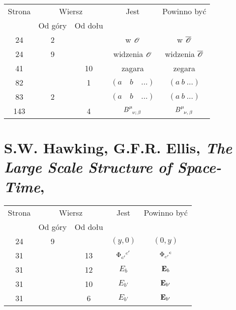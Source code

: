 \documentclass[a4paper,11pt]{article}
\numberwithin{equation}{section}
\begin{document}
\begin{center}

  \begin{tabular}{|c|c|c|c|c|}
    \hline
    Strona & \multicolumn{2}{c|}{Wiersz} & Jest
                              & Powinno być \\ \cline{2-3}
    & Od góry & Od dołu & & \\
    \hline
    24 & 2 & & w $\mathcal{O}$ & w $\overline{ \mathcal{O} }$ \\
    24 & 9 & & widzenia $\mathcal{O}$ & widzenia $\overline{ \mathcal{O} }$ \\
    41 & & 10 & zagara & zegara \\
    82 & & 1 & $( a \quad b \quad \ldots )$ & $( a \: b \: \ldots )$ \\
    83 & 2 & & $( a \quad b \quad \ldots )$ & $( a \: b \: \ldots )$ \\
    143 & & 4 & $B\indices{^\mu_{ v ; \, \beta }}$ & $B\indices{ ^\mu_{ \nu, \, \beta } }$ \\
    \hline
  \end{tabular}

\end{center}

\VerSpaceSix












\section{S.W. Hawking, G.F.R. Ellis,
  \textit{The Large Scale Structure of Space-Time},
  \cite{HawkingEllisLargeScaleStructureOfSpaceTime1973}}




\begin{center}

  \begin{tabular}{|c|c|c|c|c|}
    \hline
    Strona & \multicolumn{2}{c|}{Wiersz} & Jest
    & Powinno być \\ \cline{2-3}
    & Od góry & Od dołu & & \\
    \hline
    24 & 9 & & $( y, 0 )$ & $( 0, y )$ \\
    31 & & 13 & $\tensor[]{\Phi}{ _{c'}^{ c' } }$
    & $\tensor[]{\Phi}{ _{c'}^{ c } }$ \\
    31 & & 12 & $E_{ b }$ & $\mathbf{E}_{ b }$ \\
    31 & & 10 & $E_{ b' }$ & $\mathbf{E}_{ b' }$ \\
    31 & & 6 & $E_{ b' }$ & $\mathbf{E}_{ b' }$ \\
    \hline
  \end{tabular}

\end{center}
\end{document}
